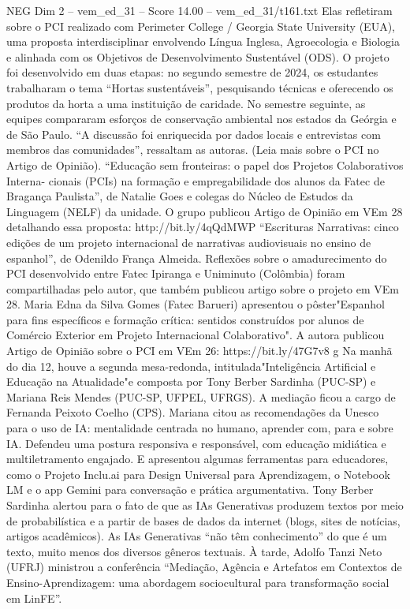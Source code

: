 \begin{textsample}{NEG Dim 2 – vem\_ed\_31 – Score 14.00 – vem\_ed\_31/t161.txt}
Elas refletiram sobre o PCI realizado com Perimeter College / Georgia State University (EUA), uma proposta interdisciplinar envolvendo Língua Inglesa, Agroecologia e Biologia e alinhada com os Objetivos de Desenvolvimento Sustentável (ODS).
O projeto foi desenvolvido em duas etapas: no segundo semestre de 2024, os estudantes trabalharam o tema “Hortas sustentáveis”, pesquisando técnicas e oferecendo os produtos da horta a uma instituição de caridade.
No semestre seguinte, as equipes compararam esforços de conservação ambiental nos estados da Geórgia e de São Paulo. “A discussão foi enriquecida por dados locais e entrevistas com membros das comunidades”, ressaltam as autoras. (Leia mais sobre o PCI no Artigo de Opinião). “Educação sem fronteiras: o papel dos Projetos Colaborativos Interna- cionais (PCIs) na formação e empregabilidade dos alunos da Fatec de Bragança Paulista”, de Natalie Goes e colegas do Núcleo de Estudos da Linguagem (NELF) da unidade.
O grupo publicou Artigo de Opinião em VEm 28 detalhando essa proposta: http://bit.ly/4qQdMWP “Escrituras Narrativas: cinco edições de um projeto internacional de narrativas audiovisuais no ensino de espanhol”, de Odenildo França Almeida.
Reflexões sobre o amadurecimento do PCI desenvolvido entre Fatec Ipiranga e Uniminuto (Colômbia) foram compartilhadas pelo autor, que também publicou artigo sobre o projeto em VEm 28.
Maria Edna da Silva Gomes (Fatec Barueri) apresentou o pôster"Espanhol para fins específicos e formação crítica: sentidos construídos por alunos de Comércio Exterior em Projeto Internacional Colaborativo".
A autora publicou Artigo de Opinião sobre o PCI em VEm 26: https://bit.ly/47G7v8 g Na manhã do dia 12, houve a segunda mesa-redonda, intitulada"Inteligência Artificial e Educação na Atualidade"e composta por Tony Berber Sardinha (PUC-SP) e Mariana Reis Mendes (PUC-SP, UFPEL, UFRGS).
A mediação ficou a cargo de Fernanda Peixoto Coelho (CPS).
Mariana citou as recomendações da Unesco para o uso de IA: mentalidade centrada no humano, aprender com, para e sobre IA.
Defendeu uma postura responsiva e responsável, com educação midiática e multiletramento engajado.
E apresentou algumas ferramentas para educadores, como o Projeto Inclu.ai para Design Universal para Aprendizagem, o Notebook LM e o app Gemini para conversação e prática argumentativa.
Tony Berber Sardinha alertou para o fato de que as IAs Generativas produzem textos por meio de probabilística e a partir de bases de dados da internet (blogs, sites de notícias, artigos acadêmicos).
As IAs Generativas “não têm conhecimento” do que é um texto, muito menos dos diversos gêneros textuais. À tarde, Adolfo Tanzi Neto (UFRJ) ministrou a conferência “Mediação, Agência e Artefatos em Contextos de Ensino-Aprendizagem: uma abordagem sociocultural para transformação social em LinFE”.

\end{textsample}
